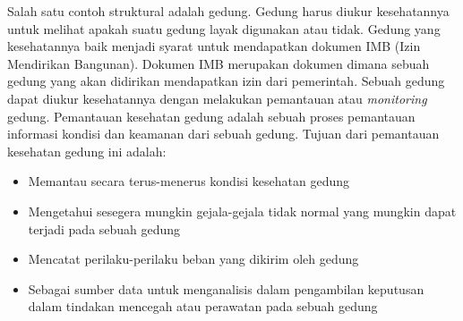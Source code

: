 Salah satu contoh struktural adalah gedung. Gedung harus diukur kesehatannya untuk melihat apakah suatu gedung layak digunakan atau tidak. Gedung yang kesehatannya baik menjadi syarat untuk mendapatkan dokumen IMB (Izin Mendirikan Bangunan). Dokumen IMB merupakan dokumen dimana sebuah gedung yang akan didirikan mendapatkan izin dari pemerintah. Sebuah gedung dapat diukur kesehatannya dengan melakukan pemantauan atau \textit{monitoring} gedung. Pemantauan kesehatan gedung adalah sebuah proses pemantauan informasi kondisi dan keamanan dari sebuah gedung. Tujuan dari pemantauan kesehatan gedung ini adalah:
\begin{itemize}
	\item Memantau secara terus-menerus kondisi kesehatan gedung
	\item Mengetahui sesegera mungkin gejala-gejala tidak normal yang mungkin dapat terjadi pada sebuah gedung
	\item Mencatat perilaku-perilaku beban yang dikirim oleh gedung
	\item Sebagai sumber data untuk menganalisis dalam pengambilan keputusan dalam tindakan mencegah atau perawatan pada sebuah gedung
\end{itemize}

